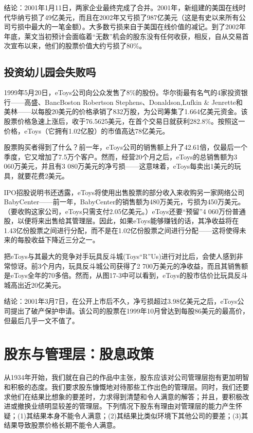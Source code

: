 \documentclass[12pt,oneside]{book}
\begin{document}
结论：2001年1月11日，两家企业最终完成了合并。2001年，新组建的美国在线时代华纳亏损了49亿美元，而且在2002年又亏损了987亿美元（这是有史以来所有公司亏损中最大的一笔金额）。大多数亏损来自于美国在线价值的减记。到了2002年年底，莱文当初预计会面临着“无数”机会的股东没有任何收获，相反，自从交易首次宣布以来，他们的股票价值大约亏损了80\%。

\subsection{投资幼儿园会失败吗}
1999年5月20日，eToys公司向公众发售了8\%的股份。华尔街最有名气的4家投资银行——高盛、BancBoston Robertson Stephens、Donaldson,Lufkin \& Jenrette和美林——以每股20美元的价格承销了832万股，为公司筹集了1.664亿美元资金。该股票价格急速上涨后，收于76.5625美元，在首个交易日就获利282.8\%。按照这一价格，eToys（它拥有1.02亿股）的市值高达78亿美元。

股票购买者得到了什么？前一年，eToys公司的销售额上升了42.61倍，仅最后一个季度，它又增加了7.5万个客户。然而，经营20个月之后，eToys的总销售额为3 060万美元，并且有3 080万美元的净亏损——这意味着，eToys每卖出1美元的玩具，就要花费2美元。

IPO招股说明书还透露，eToys将使用出售股票的部分收入来收购另一家网络公司BabyCenter——前一年，BabyCenter的销售额为480万美元，亏损为450万美元。（要收购这家公司，eToys只需支付2.05亿美元。）eToys还要“预留”4 060万份普通股，以便将来出售给其管理层。因此，如果eToys能够赚钱的话，其净收益将在1.43亿份股票之间进行分配，而不是在1.02亿份股票之间进行分配——这将使得未来的每股收益下降近三分之一。

把eToys与其最大的竞争对手玩具反斗城(Toys“R”Us)进行对比后，会使人感到非常惊讶。前3个月内，玩具反斗城公司获得了2 700万美元的净收益，而且其销售额是eToys全年的70多倍。然而，从图17-3中可以看到，eToys的股市估价比玩具反斗城高出近20亿美元。

结论：2001年3月7日，在公开上市后不久，净亏损超过3.98亿美元之后，eToys公司提出了破产保护申请。该公司的股票在1999年10月曾达到每股86美元的最高价，但最后几乎一文不值了。


\section{股东与管理层：股息政策}
从1934年开始，我们就在自己的作品中主张，股东应该对公司管理层抱有更加明智和积极的态度。我们要求股东慷慨地对待那些工作出色的管理层。同时，我们还要求他们在结果比想象的要差时，力求得到清楚和令人满意的解答；并且，要积极改进或撤换业绩明显较差的管理层。下列情况下股东有理由对管理层的能力产生怀疑；(1)其结果本身不能令人满意；(2)其结果比类似环境下其他公司的要差；(3)其结果导致股票价格长期不能令人满意。
\end{document}
